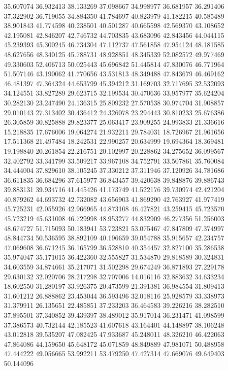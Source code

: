 35.607074
36.932413
38.133269
37.098667
34.998977
36.681957
36.291406
37.322902
36.719055
34.884350
41.784697
40.823979
41.182215
40.585489
38.901843
41.774598
40.238501
40.501287
40.665598
42.569370
43.108652
42.195081
42.846207
42.746732
44.703835
43.683096
42.843456
44.044115
45.239393
45.300245
46.734304
47.112737
47.561858
47.954124
48.181585
48.627656
48.340125
45.788731
48.928851
48.345339
52.082572
49.977469
49.330603
52.406713
50.025443
45.696842
51.445814
47.830076
46.771964
51.507146
43.190062
41.770656
43.531813
48.349488
47.843679
46.469162
46.481397
47.364324
44.653799
45.394212
31.169703
32.717695
32.532093
34.124551
33.827289
29.623715
32.199534
30.470636
33.957977
35.624204
30.282130
23.247490
24.136315
25.809232
27.570538
30.974704
31.908857
29.010143
27.313402
30.436412
24.326078
23.294443
30.810233
25.676386
26.305859
30.825888
29.823377
25.063417
23.909255
24.993833
21.336616
15.218835
17.676006
19.064274
21.932211
29.784031
18.726967
21.961656
17.511368
21.497484
18.242531
22.990257
20.634999
19.694364
18.369481
19.198840
20.261854
22.216751
20.102997
20.228862
34.275652
36.099567
32.402792
33.341799
33.509217
33.967108
34.752791
33.507861
35.760084
34.444004
37.829610
38.105245
37.330212
37.311946
37.120926
34.781686
36.611835
36.684296
37.615977
36.843457
39.420638
39.848876
39.886743
39.883131
39.934716
41.445426
41.173749
41.522176
39.730974
42.421204
40.879262
44.693732
42.732082
43.656903
41.869290
42.763927
41.977419
45.725231
42.055926
42.966965
44.873108
46.427821
43.259415
45.723570
45.723219
45.631008
46.729998
48.953277
44.832909
46.277356
51.256003
48.674727
51.715093
50.183941
53.723821
53.075467
47.847809
47.374997
48.844734
50.536595
38.892109
40.196659
39.054788
35.915657
42.234757
47.069608
36.671245
36.165799
36.528810
40.354457
32.827100
35.286538
35.974047
35.171015
36.422360
32.555827
31.534870
29.818589
30.324831
34.603559
34.874661
35.217071
31.502298
29.674249
36.871893
27.229178
29.630132
32.020706
28.217298
32.707006
14.016116
32.883632
34.633234
18.602550
31.280197
33.926375
20.473599
21.391381
36.984554
31.809413
31.601212
26.888862
23.453044
36.593496
32.018116
25.928579
33.338973
31.379911
26.135651
22.485851
37.233203
36.464583
39.226216
38.282510
37.895501
37.340852
39.439397
38.489012
35.917014
36.231471
41.098599
37.386573
40.732144
42.185523
41.607618
43.164401
44.148897
38.106248
43.012818
39.535207
47.082425
47.933687
45.248011
48.326210
46.422063
47.864086
44.159650
45.648172
45.071859
48.849889
47.981071
50.488958
47.444222
49.056665
53.992211
53.479250
47.427314
47.669076
49.649403
50.144096
